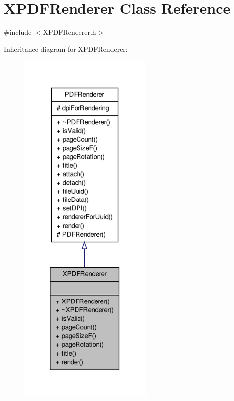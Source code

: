 \hypertarget{class_x_p_d_f_renderer}{\section{X\-P\-D\-F\-Renderer Class Reference}
\label{df/d96/class_x_p_d_f_renderer}
}


{\ttfamily \#include $<$X\-P\-D\-F\-Renderer.\-h$>$}



Inheritance diagram for X\-P\-D\-F\-Renderer\-:
\nopagebreak
\begin{figure}[H]
\begin{center}
\leavevmode
\includegraphics[width=184pt]{d4/d5d/class_x_p_d_f_renderer__inherit__graph}
\end{center}
\end{figure}


